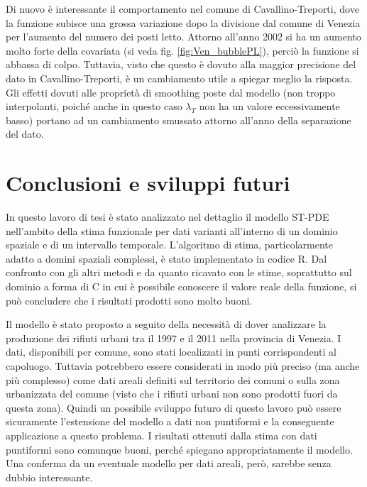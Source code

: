 \documentclass[a4paper,11pt,twoside,openright]{book}							%
\begin{document}
Di nuovo è interessante il comportamento nel comune di Cavallino-Treporti, dove la funzione subisce una grossa variazione dopo la divisione dal comune di Venezia per l'aumento del numero dei posti letto. Attorno all'anno 2002 si ha un aumento molto forte della covariata (si veda fig. \ref{fig:Ven_bubblePL}), perciò la funzione si abbassa di colpo. Tuttavia, visto che questo è dovuto alla maggior precisione del dato in Cavallino-Treporti, è un cambiamento utile a spiegar meglio la risposta. Gli effetti dovuti alle proprietà di smoothing poste dal modello (non troppo interpolanti, poiché anche in questo caso $\lambda_T$ non ha un valore eccessivamente basso) portano ad un cambiamento smussato attorno all'anno della separazione del dato.
\newpage
\thispagestyle{empty}

\chapter{Conclusioni e sviluppi futuri}
\label{cap:conclusione}

In questo lavoro di tesi è stato analizzato nel dettaglio il modello ST-PDE nell'ambito della stima funzionale per dati varianti all'interno di un dominio spaziale e di un intervallo temporale. L'algoritmo di stima, particolarmente adatto a domini spaziali complessi, è stato implementato in codice R. Dal confronto con gli altri metodi e da quanto ricavato con le stime, soprattutto sul dominio a forma di C in cui è possibile conoscere il valore reale della funzione, si può concludere che i risultati prodotti sono molto buoni.

Il modello è stato proposto a seguito della necessità di dover analizzare la produzione dei rifiuti urbani tra il 1997 e il 2011 nella provincia di Venezia. I dati, disponibili per comune, sono stati localizzati in punti corrispondenti al capoluogo. Tuttavia potrebbero essere considerati in modo più preciso (ma anche più complesso) come dati areali definiti sul territorio dei comuni o sulla zona urbanizzata del comune (visto che i rifiuti urbani non sono prodotti fuori da questa zona). Quindi un possibile sviluppo futuro di questo lavoro può essere sicuramente l'estensione del modello a dati non puntiformi e la conseguente applicazione a questo problema. I risultati ottenuti dalla stima con dati puntiformi sono comunque buoni, perché spiegano appropriatamente il modello. Una conferma da un eventuale modello per dati areali, però, sarebbe senza dubbio interessante.
\end{document}
